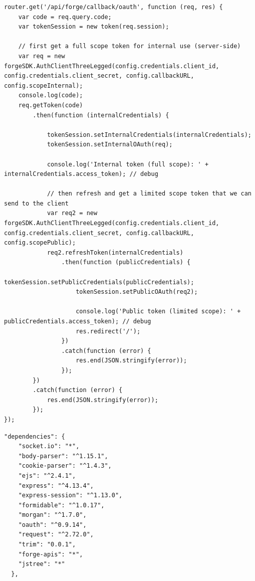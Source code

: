 \documentclass[letterpaper, 10pt, draftclsnofoot, compsoc, onecolumn]{IEEEtran}
\begin{document}
\begin{lstlisting}[caption=Exchanging Authorization Code for Token function]
router.get('/api/forge/callback/oauth', function (req, res) {
    var code = req.query.code;
    var tokenSession = new token(req.session);

    // first get a full scope token for internal use (server-side)
    var req = new forgeSDK.AuthClientThreeLegged(config.credentials.client_id, config.credentials.client_secret, config.callbackURL, config.scopeInternal);
    console.log(code);
    req.getToken(code)
        .then(function (internalCredentials) {

            tokenSession.setInternalCredentials(internalCredentials);
            tokenSession.setInternalOAuth(req);

            console.log('Internal token (full scope): ' + internalCredentials.access_token); // debug

            // then refresh and get a limited scope token that we can send to the client
            var req2 = new forgeSDK.AuthClientThreeLegged(config.credentials.client_id, config.credentials.client_secret, config.callbackURL, config.scopePublic);
            req2.refreshToken(internalCredentials)
                .then(function (publicCredentials) {
                    tokenSession.setPublicCredentials(publicCredentials);
                    tokenSession.setPublicOAuth(req2);

                    console.log('Public token (limited scope): ' + publicCredentials.access_token); // debug
                    res.redirect('/');
                })
                .catch(function (error) {
                    res.end(JSON.stringify(error));
                });
        })
        .catch(function (error) {
            res.end(JSON.stringify(error));
        });
});
\end{lstlisting}
\begin{lstlisting}[caption=Package depedencies]
  "dependencies": {
    "socket.io": "*",
    "body-parser": "^1.15.1",
    "cookie-parser": "^1.4.3",
    "ejs": "^2.4.1",
    "express": "^4.13.4",
    "express-session": "^1.13.0",
    "formidable": "^1.0.17",
    "morgan": "^1.7.0",
    "oauth": "^0.9.14",
    "request": "^2.72.0",
    "trim": "0.0.1",
    "forge-apis": "*",
    "jstree": "*"
  },
\end{lstlisting}
\end{document}
